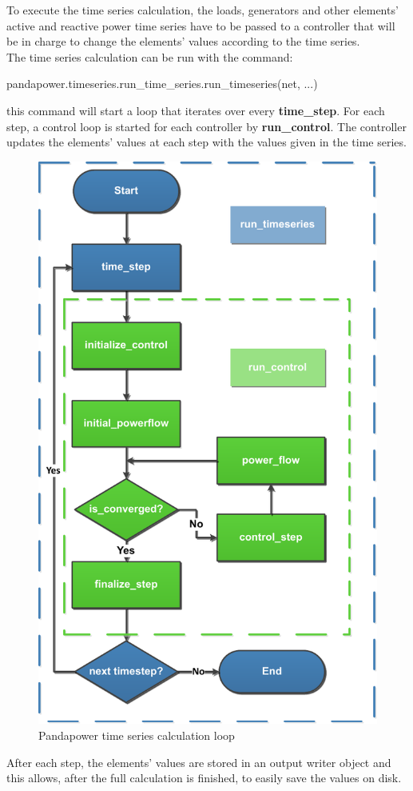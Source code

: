 To execute the time series calculation, the loads, generators and other elements' active and reactive power time series have to be passed to a controller that will be in charge to change the elements' values according to the time series. \\

The time series calculation can be run with the command: 
\begin{algorithm}[h]
\state pandapower.timeseries.run\_time\_series.run\_timeseries(net, ...)
\end{algorithm}

\noindent this command will start a loop that iterates over every \textbf{time\_step}. For each step, a control loop is started for each controller by \textbf{run\_control}. The controller updates the elements' values at each step with the values given in the time series.

\begin{figure}[H]
\centering
    \includegraphics[width=.4\linewidth]{images/Background/Pandapower/run_timeseries_loop.pdf}
\caption{Pandapower time series calculation loop \cite{pandapowerts}}
\end{figure}

After each step, the elements' values are stored in an output writer object and this allows, after the full calculation is finished, to easily save the values on disk.

